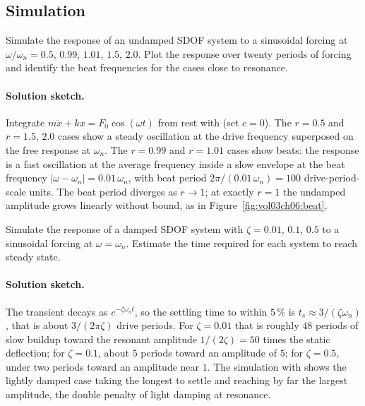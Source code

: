 \subsection*{Simulation}

\begin{exercise}
Simulate the response of an undamped SDOF system to a sinusoidal
forcing at $\omega/\omega_n = 0.5$, $0.99$, $1.01$, $1.5$, $2.0$.
Plot the response over twenty periods of forcing and identify the
beat frequencies for the cases close to resonance.

\paragraph{Solution sketch.} Integrate $m\ddot x + kx = F_0\cos(\omega
t)$ from rest with  (set $c = 0$). The
$r = 0.5$ and $r = 1.5$, $2.0$ cases show a steady oscillation at the
drive frequency superposed on the free response at $\omega_n$. The
$r = 0.99$ and $r = 1.01$ cases show beats: the response is a fast
oscillation at the average frequency inside a slow envelope at the
beat frequency $|\omega - \omega_n| = 0.01\,\omega_n$, with beat
period $2\pi/(0.01\,\omega_n) = 100$ drive-period-scale units. The
beat period diverges as $r \to 1$; at exactly $r = 1$ the undamped
amplitude grows linearly without bound, as in
Figure~\ref{fig:vol03ch06:beat}.
\end{exercise}

\begin{exercise}
Simulate the response of a damped SDOF system with $\zeta = 0.01$,
$0.1$, $0.5$ to a sinusoidal forcing at $\omega = \omega_n$.
Estimate the time required for each system to reach steady state.

\paragraph{Solution sketch.} The transient decays as $e^{-\zeta
\omega_n t}$, so the settling time to within $5\,\%$ is $t_s \approx
3/(\zeta\omega_n)$, that is about $3/(2\pi\zeta)$ drive periods. For
$\zeta = 0.01$ that is roughly $48$ periods of slow buildup toward the
resonant amplitude $1/(2\zeta) = 50$ times the static deflection; for
$\zeta = 0.1$, about $5$ periods toward an amplitude of $5$; for
$\zeta = 0.5$, under two periods toward an amplitude near $1$. The
simulation with  shows the lightly damped
case taking the longest to settle and reaching by far the largest
amplitude, the double penalty of light damping at resonance.
\end{exercise}

